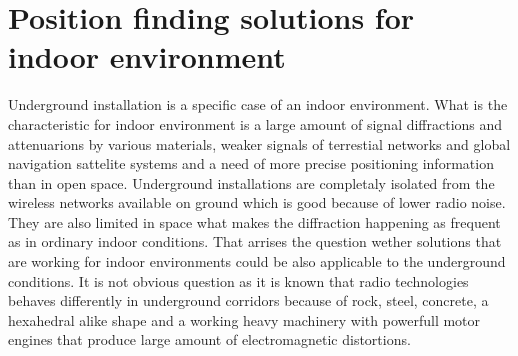 \documentclass[../main.tex]{subfiles}
\begin{document}
\chapter{Position finding solutions for indoor environment}
\label{chapter:position_finding_solution}

Underground installation is a specific case of an indoor environment. What is the characteristic for indoor environment is a large amount of signal diffractions and attenuarions by various materials, weaker signals of terrestial networks and global navigation sattelite systems and a need of more precise positioning information than in open space. Underground installations are completaly isolated from the wireless networks available on ground which is good because of lower radio noise. They are also limited in space what makes the diffraction happening as frequent as in ordinary indoor conditions. That arrises the question wether solutions that are working for indoor environments could be also applicable to the underground conditions. It is not obvious question as it is known that radio technologies behaves differently in underground corridors because of rock, steel, concrete, a hexahedral\cite{rf_in_mines_straight_gallery}\cite{rf_in_tunnel_waveguide_effect} alike shape and a working heavy machinery with powerfull motor engines that produce large amount of electromagnetic distortions.
\end{document}
